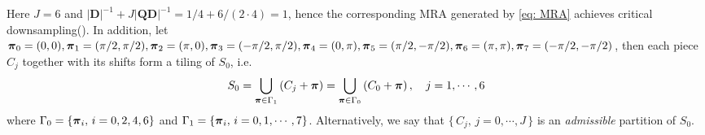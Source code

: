 Here $J= 6$ and $ |\mathbf{D}|^{-1} + J|\mathbf{QD}|^{-1} = 1/4 + 6/ (2\cdot 4) = 1$, hence the corresponding MRA generated by \eqref{eq: MRA} achieves critical downsampling(\cite{durand2007}). 
In addition, let {\small $\boldsymbol{\pi}_0 = (0,0), \boldsymbol{\pi}_1 = (\pi/2,\pi/2), \boldsymbol{\pi}_2 = (\pi,0),\boldsymbol{\pi}_3 = (-\pi/2,\pi/2), \boldsymbol{\pi}_4 = (0,\pi), \boldsymbol{\pi}_5 = (\pi/2,-\pi/2),\boldsymbol{\pi}_6 = (\pi,\pi), \boldsymbol{\pi}_7=(-\pi/2,-\pi/2)$}, then each piece $C_j$ together with its shifts form a tiling of $S_0$, i.e.
\begin{align}\label{eq: tiling}
S_0 = \bigcup_{\boldsymbol{\pi}\in\Gamma_1}\left(C_j + \boldsymbol{\pi}\right) = \bigcup_{\boldsymbol{\pi}\in\Gamma_0}\left(C_0 + \boldsymbol{\pi}\right),\quad j = 1,\cdots,6
\end{align}
where
$\Gamma_0= \{\boldsymbol{\pi}_i,\, i = 0,2,4,6\}$ and 
$\Gamma_1 = \{\boldsymbol{\pi}_i,\, i = 0,1,\cdots,7\}$.
Alternatively, we say that $\{\,C_j,\, j = 0,\cdots,J\,\}$ is an {\it admissible} partition of $S_0$.
